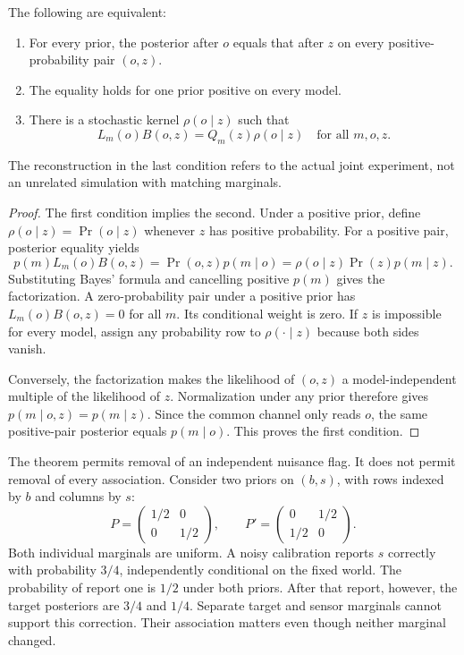 \begin{theorem}\label{r:bayes}
The following are equivalent:
\begin{enumerate}
\item For every prior, the posterior after $o$ equals that after $z$ on every positive-probability pair $(o,z)$.
\item The equality holds for one prior positive on every model.
\item There is a stochastic kernel $\rho(o\mid z)$ such that
\[
L_m(o)B(o,z)=Q_m(z)\rho(o\mid z)\quad\text{for all }m,o,z.
\]
\end{enumerate}
The reconstruction in the last condition refers to the actual joint experiment, not an unrelated simulation with matching marginals.
\end{theorem}
\begin{proof}
The first condition implies the second. Under a positive prior, define $\rho(o\mid z)=\Pr(o\mid z)$ whenever $z$ has positive probability. For a positive pair, posterior equality yields
\[
p(m)L_m(o)B(o,z)=\Pr(o,z)p(m\mid o)
=\rho(o\mid z)\Pr(z)p(m\mid z).
\]
Substituting Bayes' formula and cancelling positive $p(m)$ gives the factorization. A zero-probability pair under a positive prior has $L_m(o)B(o,z)=0$ for all $m$. Its conditional weight is zero. If $z$ is impossible for every model, assign any probability row to $\rho(\cdot\mid z)$ because both sides vanish.

Conversely, the factorization makes the likelihood of $(o,z)$ a model-independent multiple of the likelihood of $z$. Normalization under any prior therefore gives $p(m\mid o,z)=p(m\mid z)$. Since the common channel only reads $o$, the same positive-pair posterior equals $p(m\mid o)$. This proves the first condition.
\end{proof}

The theorem permits removal of an independent nuisance flag. It does not permit removal of every association. Consider two priors on $(b,s)$, with rows indexed by $b$ and columns by $s$:
\[
P=\begin{pmatrix}1/2&0\\0&1/2\end{pmatrix},\qquad
P'=\begin{pmatrix}0&1/2\\1/2&0\end{pmatrix}.
\]
Both individual marginals are uniform. A noisy calibration reports $s$ correctly with probability $3/4$, independently conditional on the fixed world. The probability of report one is $1/2$ under both priors. After that report, however, the target posteriors are $3/4$ and $1/4$. Separate target and sensor marginals cannot support this correction. Their association matters even though neither marginal changed.

